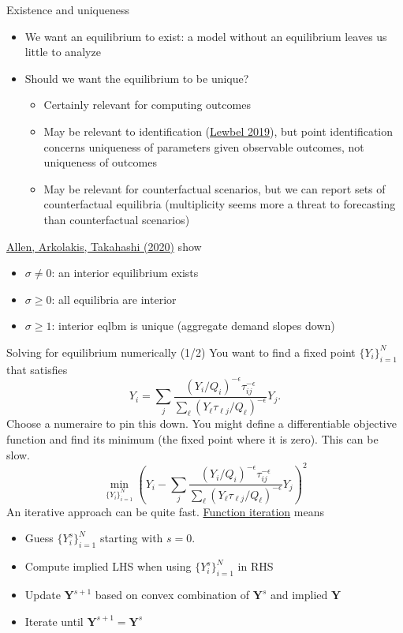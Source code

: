 \documentclass[10pt,notes=hide]{beamer}
\begin{document}
\begin{frame}{Existence and uniqueness}
\begin{itemize}
\item We want an equilibrium to exist:
a model without an equilibrium leaves us little to analyze
\item Should we want the equilibrium to be unique?
\begin{itemize}
\item Certainly relevant for computing outcomes
\item May be relevant to identification (\href{https://www.aeaweb.org/articles?id=10.1257/jel.20181361}{Lewbel 2019}),
but point identification concerns uniqueness of parameters given observable outcomes,
not uniqueness of outcomes
\item May be relevant for counterfactual scenarios,
but we can report sets of counterfactual equilibria
(multiplicity seems more a threat to forecasting than counterfactual scenarios)
\end{itemize}
\end{itemize}
\href{https://doi.org/10.1086/704385}{Allen, Arkolakis, Takahashi (2020)} show
\begin{itemize}
\item $\sigma \neq 0$: an interior equilibrium exists
\item $\sigma \geq 0$: all equilibria are interior
\item $\sigma \geq 1$: interior eqlbm is unique (aggregate demand slopes down)
\end{itemize}
\end{frame}
\begin{frame}{Solving for equilibrium numerically (1/2)}
You want to find a fixed point $\{Y_i\}_{i=1}^{N}$ that satisfies
$$
Y_i
=
\sum_j \frac{\left(Y_i/Q_i\right)^{-\epsilon} \tau_{ij}^{-\epsilon}}{\sum_{\ell} \left(Y_{\ell} \tau_{\ell j} / Q_{\ell}\right)^{-\epsilon}} Y_j
.$$
Choose a numeraire to pin this down.
You might define a differentiable objective function and find its minimum (the fixed point where it is zero).
This can be slow.
$$
\min_{\{Y_{i}\}_{i=1}^{N}}
\left(Y_i
-
\sum_j \frac{\left(Y_i/Q_i\right)^{-\epsilon} \tau_{ij}^{-\epsilon}}{\sum_{\ell} \left(Y_{\ell} \tau_{\ell j} / Q_{\ell}\right)^{-\epsilon}} Y_j
\right)^2
$$
An iterative approach can be quite fast. \href{https://raw.githack.com/AEM7130/class-repo/master/lecture-notes/04-optimization/04-optimization.html\#40}{Function iteration} means
\begin{itemize}
\item Guess $\{Y_{i}^{s}\}_{i=1}^{N}$ starting with $s=0$.
\item Compute implied LHS when using $\{Y_{i}^{s}\}_{i=1}^{N}$ in RHS
\item Update $\mathbf{Y}^{s+1}$ based on convex combination of $\mathbf{Y}^{s}$ and implied $\mathbf{Y}$
\item Iterate until $\mathbf{Y}^{s+1} = \mathbf{Y}^{s}$
\end{itemize}
\end{frame}
\end{document}
